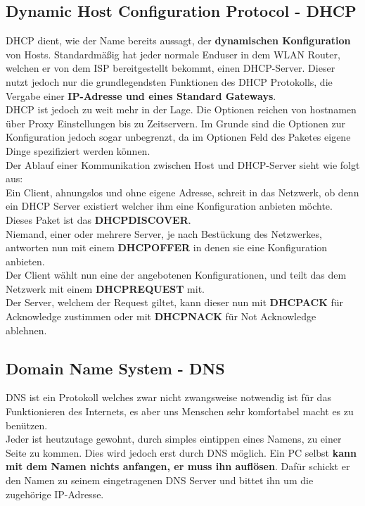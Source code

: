 \documentclass[12pt,a4paper]{report}
\begin{document}
\subsection{Dynamic Host Configuration Protocol - DHCP}\label{ssec:dhcp}
DHCP dient, wie der Name bereits aussagt, der \textbf{dynamischen Konfiguration} von Hosts. Standardmäßig hat jeder normale Enduser in dem WLAN Router, welchen er von dem ISP bereitgestellt bekommt, einen DHCP-Server. Dieser nutzt jedoch nur die grundlegendsten Funktionen des DHCP Protokolls, die Vergabe einer \textbf{IP-Adresse und eines Standard Gateways}.\\
DHCP ist jedoch zu weit mehr in der Lage. Die Optionen reichen von hostnamen über Proxy Einstellungen bis zu Zeitservern. Im Grunde sind die Optionen zur Konfiguration jedoch sogar unbegrenzt, da im Optionen Feld des Paketes eigene Dinge spezifiziert werden können.\\

Der Ablauf einer Kommunikation zwischen Host und DHCP-Server sieht wie folgt aus:\\
Ein Client, ahnungslos und ohne eigene Adresse, schreit in das Netzwerk, ob denn ein DHCP Server existiert welcher ihm eine Konfiguration anbieten möchte. Dieses Paket ist das \textbf{DHCPDISCOVER}.\\
Niemand, einer oder mehrere Server, je nach Bestückung des Netzwerkes, antworten nun mit einem \textbf{DHCPOFFER} in denen sie eine Konfiguration anbieten.\\
Der Client wählt nun eine der angebotenen Konfigurationen, und teilt das dem Netzwerk mit einem \textbf{DHCPREQUEST} mit.\\
Der Server, welchem der Request giltet, kann dieser nun mit \textbf{DHCPACK} für Acknowledge zustimmen oder mit \textbf{DHCPNACK} für Not Acknowledge ablehnen.\\

\subsection{Domain Name System - DNS}
DNS ist ein Protokoll welches zwar nicht zwangsweise notwendig ist für das Funktionieren des Internets, es aber uns Menschen sehr komfortabel macht es zu benützen.\\
Jeder ist heutzutage gewohnt, durch simples eintippen eines Namens, zu einer Seite zu kommen. Dies wird jedoch erst durch DNS möglich. Ein PC selbst \textbf{kann mit dem Namen nichts anfangen, er muss ihn auflösen}. Dafür schickt er den Namen zu seinem eingetragenen DNS Server und bittet ihn um die zugehörige IP-Adresse.\\
\end{document}
